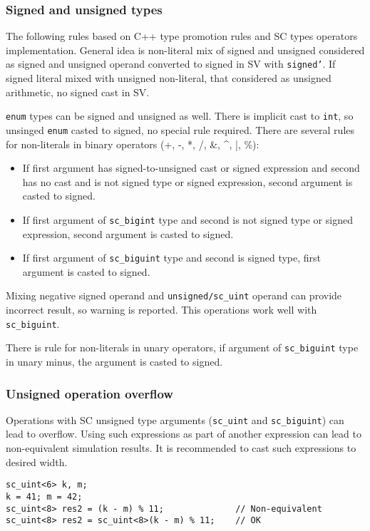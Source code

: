 \subsubsection{Signed and unsigned types}

The following rules based on C++ type promotion rules and SC types operators implementation.
General idea is non-literal mix of signed and unsigned considered as signed and unsigned operand converted to signed in SV with {\tt signed'}. If signed literal mixed with unsigned non-literal, that considered as unsigned arithmetic, no signed cast in SV.

{\tt enum} types can be signed and unsigned as well. There is implicit cast to {\tt int}, so unsinged {\tt enum} casted to signed, no special rule required.
There are several rules for non-literals in binary operators (+, -, *, /, \&, \textasciicircum, |, \%):
%
\begin{itemize}
\item If first argument has signed-to-unsigned cast or signed expression and second has no cast and is not signed type or signed expression, second argument is casted to signed.
\item If first argument of {\tt sc\_bigint} type and second is not signed type or signed expression, second argument is casted to signed.
\item If first argument of {\tt sc\_biguint} type and second is signed type, first argument is casted to signed.
\end{itemize}
%
Mixing negative signed operand and {\tt unsigned/sc\_uint} operand can provide incorrect result, so warning is reported. This operations work well with {\tt sc\_biguint}.

There is rule for non-literals in unary operators, if argument of {\tt sc\_biguint} type in unary minus, the argument is casted to signed.

\subsubsection{Unsigned operation overflow}

Operations with SC unsigned type arguments ({\tt sc\_uint} and {\tt sc\_biguint}) can lead to overflow. Using such expressions as part of another expression can lead to non-equivalent simulation results. It is recommended to cast such expressions to desired width.
%
\begin{lstlisting}[style=mycpp]
sc_uint<6> k, m;
k = 41; m = 42;
sc_uint<8> res2 = (k - m) % 11;              // Non-equivalent
sc_uint<8> res2 = sc_uint<8>(k - m) % 11;    // OK
\end{lstlisting}

